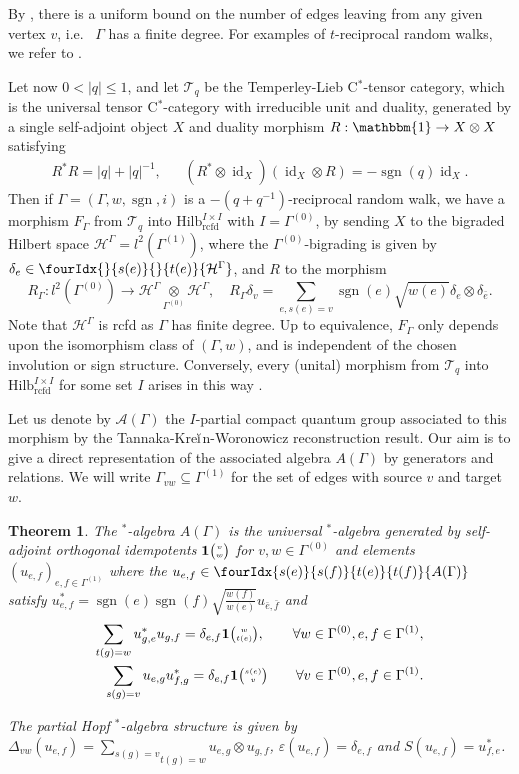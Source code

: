 \documentclass[10pt]{article}
\DeclareMathOperator{\id}{id}
\DeclareMathOperator{\rcf}{\mathrm{rcfd}}
\DeclareMathOperator{\sgn}{\mathrm{sgn}}
\newcommand{\Hsp}{\mathcal{H}}
\newcommand{\Hilbrcf}{\mathrm{Hilb}^{I\times I}_{\rcf}}
\newcommand{\Grt}[3]{#1{\tiny {\begin{pmatrix} #2\\#3\end{pmatrix}}}}
\newcommand{\UnitC}[2]{\Grt{\mathbf{1}}{#1}{#2}}
\newcommand{\Grru}[2]{{\tiny \begin{pmatrix} #1 \\ #2\end{pmatrix}}}
\newcommand{\Gr}[5]{\fourIdx{#2}{#4}{#3}{#5}{#1}}%
\newcommand{\Gru}[3]{\Gr{#1}{}{}{#2}{#3}}
\newtheorem{Theorem}{Theorem}[section]
\theoremstyle{definition}
\numberwithin{equation}{section}
\begin{document}
By \cite[Proposition 3.1]{DCY1}, there is a uniform bound on the number of edges leaving from any given vertex $v$, i.e.~ $\Gamma$ has a finite degree. For examples of $t$-reciprocal random walks, we refer to \cite{DCY1}. 

Let now $0<|q|\leq 1$, and let $\mathcal{T}_q$ be the Temperley-Lieb C$^*$-tensor category, which is the universal tensor C$^*$-category with irreducible unit and duality, generated by a single self-adjoint object $X$ and duality morphism $R: \mathbbm{1} \rightarrow  X\otimes X$ satisfying 
\begin{align*} R^*R= |q|+|q|^{-1}, &&(R^*\otimes \id_X)(\id_X\otimes R) = -\sgn(q)\id_X.\end{align*} Then if $\Gamma = (\Gamma,w,\sgn,i)$ is a $-(q+q^{-1})$-reciprocal random walk, we have a morphism $F_{\Gamma}$ from $\mathcal{T}_q$ into $\Hilbrcf$ with $I= \Gamma^{(0)}$, by sending $X$ to the bigraded Hilbert space  $\Hsp^{\Gamma}=l^2(\Gamma^{(1)})$, where the $\Gamma^{(0)}$-bigrading is given by $\delta_e \in \Gru{\Hsp^{\Gamma}}{s(e)}{t(e)}$, and $R$ to the morphism \[R_{\Gamma}:l^2(\Gamma^{(0)})\rightarrow \Hsp^{\Gamma}\underset{\Gamma^{(0)}}{\otimes} \Hsp^{\Gamma},\quad R_{\Gamma} \delta_v =\sum_{e,s(e) = v} \sgn(e)\sqrt{w(e)}\delta_e \otimes \delta_{\bar{e}}.\] Note that $\Hsp^{\Gamma}$ is rcfd as $\Gamma$ has finite degree.  Up to equivalence, $F_{\Gamma}$ only depends upon the isomorphism class of $(\Gamma,w)$, and is independent of the chosen involution or sign structure. Conversely, every (unital) morphism from $\mathcal{T}_q$ into $\Hilbrcf$ for some set $I$ arises in this way \cite{DCY2}.

Let us denote by $\mathscr{A}(\Gamma)$ the $I$-partial compact quantum group associated to this morphism by the Tannaka-Kre$\breve{\textrm{\i}}$n-Woronowicz reconstruction result. Our aim is to give a direct representation of the associated algebra $A(\Gamma)$ by generators and relations. We will write $\Gamma_{vw}\subseteq \Gamma^{(1)}$ for the set of edges with source $v$ and target $w$.

\begin{Theorem}\label{TheoGenRel} The $^*$-algebra $A(\Gamma)$ is the universal $^*$-algebra generated by self-adjoint orthogonal idempotents $\UnitC{v}{w}$ for $v,w\in \Gamma^{(0)}$ and elements $(u_{e,f})_{e,f\in \Gamma^{(1)}}$ where the $u_{e,f}\in \Gr{A(\Gamma)}{s(e)}{t(e)}{s(f)}{t(f)}$ satisfy $u_{e,f}^* = \sgn(e)\sgn(f)\sqrt{\frac{w(f)}{w(e)}} u_{\bar{e},\bar{f}}$ and 
\begin{eqnarray} 
\label{EqUni1} \sum_{t(g)=w} u_{g,e}^*u_{g,f} = \delta_{e,f}\mathbf{1}\Grru{w}{t(e)}, \qquad \forall w\in \Gamma^{(0)}, e,f\in \Gamma^{(1)},\\ 
\label{EqUni2}\sum_{s(g)=v} u_{e,g}u_{f,g}^* = \delta_{e,f} \mathbf{1}\Grru{s(e)}{v}\qquad \forall v\in \Gamma^{(0)}, e,f\in \Gamma^{(1)}.
\end{eqnarray}

The partial Hopf $^*$-algebra structure is given by $\Delta_{vw}(u_{e,f}) = \underset{t(g) = w}{\underset{s(g) = v}{\sum}} u_{e,g}\otimes u_{g,f}$, $\varepsilon(u_{e,f}) = \delta_{e,f}$ and $S(u_{e,f}) = u_{f,e}^*$. 
\end{Theorem} 
\end{document}
